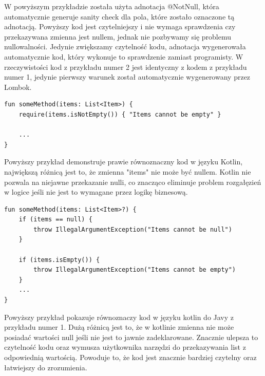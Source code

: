 W powyższym przykładzie została użyta adnotacja @NotNull, która automatycznie generuje sanity check dla pola, które zostało oznaczone tą adnotacją.
Powyższy kod jest czytelniejszy i nie wymaga sprawdzenia czy przekazywana zmienna jest nullem, jednak nie pozbywamy się problemu nullowalności.
Jedynie zwiększamy czytelność kodu, adnotacja wygenerowała automatycznie kod, który wykonuje to sprawdzenie zamiast programisty.
W rzeczywistości kod z przykładu numer 2 jest identyczny z kodem z przykładu numer 1, jedynie pierwszy warunek został automatycznie wygenerowany przez Lombok.

\begin{lstlisting}[caption=Przykład w języku Kotlin]
fun someMethod(items: List<Item>) {
    require(items.isNotEmpty()) { "Items cannot be empty" }

    ...
}
\end{lstlisting}
Powyższy przykład demonstruje prawie równoznaczny kod w języku Kotlin, największą różnicą jest to, że zmienna "items" nie może być nullem.
Kotlin nie pozwala na niejawne przekazanie nulli, co znacząco eliminuje problem rozgałęzień w logice jeśli nie jest to wymagane przez logikę biznesową.
\begin{lstlisting}[caption=Przykład w języku Kotlin]
fun someMethod(items: List<Item>?) {
    if (items == null) {
        throw IllegalArgumentException("Items cannot be null")
    }

    if (items.isEmpty()) {
        throw IllegalArgumentException("Items cannot be empty")
    }
    ...
}
\end{lstlisting}
Powyższy przykład pokazuje równoznaczy kod w języku kotlin do Javy z przykładu numer 1.
Dużą różnicą jest to, że w kotlinie zmienna nie może posiadać wartości null jeśli nie jest to jawnie zadeklarowane.
Znacznie ulepsza to czytelność kodu oraz wymusza użytkownika narzędzi do przekazywania list z odpowiednią wartością.
Powoduje to, że kod jest znacznie bardziej czytelny oraz łatwiejszy do zrozumienia.
